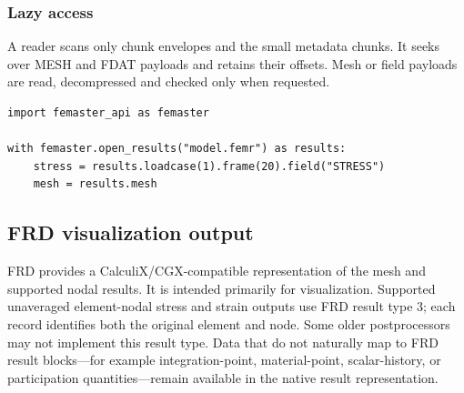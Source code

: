\subsubsection{Lazy access}

A reader scans only chunk envelopes and the small metadata chunks. It seeks over MESH and FDAT payloads and retains their offsets. Mesh or field payloads are read, decompressed and checked only when requested.

\begin{verbatim}
import femaster_api as femaster

with femaster.open_results("model.femr") as results:
    stress = results.loadcase(1).frame(20).field("STRESS")
    mesh = results.mesh
\end{verbatim}

\subsection{FRD visualization output}

FRD provides a CalculiX/CGX-compatible representation of the mesh and supported nodal results. It is intended primarily for visualization. Supported unaveraged element-nodal stress and strain outputs use FRD result type 3; each record identifies both the original element and node. Some older postprocessors may not implement this result type. Data that do not naturally map to FRD result blocks---for example integration-point, material-point, scalar-history, or participation quantities---remain available in the native result representation.

